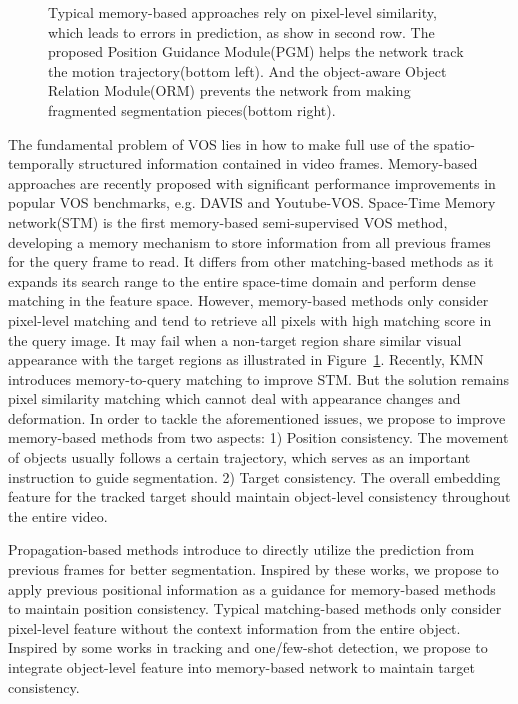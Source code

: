 \documentclass[final]{cvpr}
\begin{document}
\begin{figure}[!t]
\begin{center}
	\setlength{\fboxrule}{0pt}
\end{center}
\caption{Typical memory-based approaches rely on pixel-level similarity, which leads to errors in prediction, as show in second row. The proposed Position Guidance Module(PGM) helps the network track the motion trajectory(bottom left).  And the object-aware Object Relation Module(ORM) prevents the network from making fragmented segmentation pieces(bottom right).}
\label{fig:fig1}
\end{figure}

The fundamental problem of VOS lies in how to make full use of the spatio-temporally structured information contained in video frames. Memory-based approaches are recently proposed with significant performance improvements in popular VOS benchmarks, e.g. DAVIS\cite{davis2016,davis2017} and Youtube-VOS\cite{youtubevos}. Space-Time Memory network(STM)\cite{STM} is the first memory-based semi-supervised VOS method, developing a memory mechanism to store information from all previous frames for the query frame to read. It differs from other matching-based methods as it expands its search range to the entire space-time domain and perform dense matching in the feature space. However, memory-based methods only consider pixel-level matching and tend to retrieve all pixels with high matching score in the query image. It may fail when a non-target region share similar visual appearance with the target regions
as illustrated in Figure~\ref{fig:fig1}. Recently, KMN\cite{KMN} introduces memory-to-query matching to improve STM. But the solution remains pixel similarity matching which cannot deal with appearance changes and deformation. In order to tackle the aforementioned issues, we propose to improve memory-based methods from two aspects: 1) Position consistency. The movement of objects usually follows a certain trajectory, which serves as an important instruction to guide segmentation. 2) Target consistency. The overall embedding feature for the tracked target should maintain object-level consistency throughout the entire video.



Propagation-based methods\cite{osmn,rgmp,agss-vos} introduce to directly utilize the prediction from previous frames for better segmentation. Inspired by these works, we propose to apply previous positional information as a guidance for memory-based methods to maintain position consistency. Typical matching-based methods\cite{videomatch, PML} only consider pixel-level feature without the context information from the entire object. Inspired by some works in tracking\cite{siamfc} and one/few-shot detection\cite{fsod,hsieh2019one}, we propose to integrate object-level feature into memory-based network to maintain target consistency. 
\end{document}
